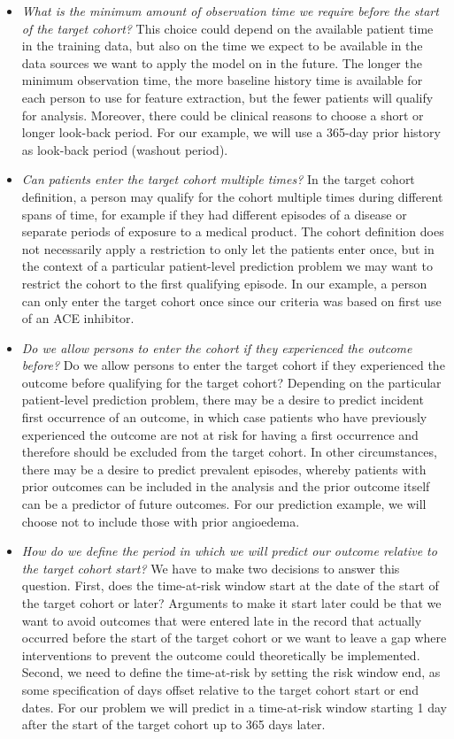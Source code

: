 \documentclass[11pt]{book}
\theoremstyle{definition}
\theoremstyle{definition}
\theoremstyle{definition}
\theoremstyle{remark}
\begin{document}
\begin{itemize}
\item
  \emph{What is the minimum amount of observation time we require before the start of the target cohort?} This choice could depend on the available patient time in the training data, but also on the time we expect to be available in the data sources we want to apply the model on in the future. The longer the minimum observation time, the more baseline history time is available for each person to use for feature extraction, but the fewer patients will qualify for analysis. Moreover, there could be clinical reasons to choose a short or longer look-back period. For our example, we will use a 365-day prior history as look-back period (washout period).
\item
  \emph{Can patients enter the target cohort multiple times?} In the target cohort definition, a person may qualify for the cohort multiple times during different spans of time, for example if they had different episodes of a disease or separate periods of exposure to a medical product. The cohort definition does not necessarily apply a restriction to only let the patients enter once, but in the context of a particular patient-level prediction problem we may want to restrict the cohort to the first qualifying episode. In our example, a person can only enter the target cohort once since our criteria was based on first use of an ACE inhibitor.
\item
  \emph{Do we allow persons to enter the cohort if they experienced the outcome before?} Do we allow persons to enter the target cohort if they experienced the outcome before qualifying for the target cohort? Depending on the particular patient-level prediction problem, there may be a desire to predict incident first occurrence of an outcome, in which case patients who have previously experienced the outcome are not at risk for having a first occurrence and therefore should be excluded from the target cohort. In other circumstances, there may be a desire to predict prevalent episodes, whereby patients with prior outcomes can be included in the analysis and the prior outcome itself can be a predictor of future outcomes. For our prediction example, we will choose not to include those with prior angioedema.
\item
  \emph{How do we define the period in which we will predict our outcome relative to the target cohort start?} We have to make two decisions to answer this question. First, does the time-at-risk window start at the date of the start of the target cohort or later? Arguments to make it start later could be that we want to avoid outcomes that were entered late in the record that actually occurred before the start of the target cohort or we want to leave a gap where interventions to prevent the outcome could theoretically be implemented. Second, we need to define the time-at-risk by setting the risk window end, as some specification of days offset relative to the target cohort start or end dates. For our problem we will predict in a time-at-risk window starting 1 day after the start of the target cohort up to 365 days later.

\end{itemize}
\end{document}
